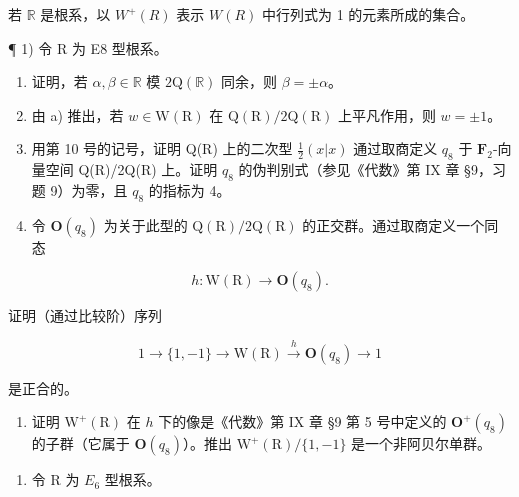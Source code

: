 
若 \(\mathbb{R}\) 是根系，以 \(W^{+}(R)\) 表示 \(W(R)\) 中行列式为 1 的元素所成的集合。

¶ 1) 令 R 为 E8 型根系。

\begin{enumerate}
\def\labelenumi{\alph{enumi})}
\item
  证明，若 \(\alpha, \beta \in \mathbb{R}\) 模 \(2\mathrm{Q}(\mathbb{R})\) 同余，则 \(\beta = \pm \alpha\)。
\item
  由 a) 推出，若 \(w \in \mathrm{W}(\mathrm{R})\) 在 \(\mathrm{Q}(\mathrm{R}) / 2\mathrm{Q}(\mathrm{R})\) 上平凡作用，则 \(w = \pm 1\)。
\item
  用第 10 号的记号，证明 Q(R) 上的二次型 \(\frac{1}{2}(x|x)\) 通过取商定义 \(q_{8}\) 于 \(\mathbf{F}_2\)-向量空间 Q(R)/2Q(R) 上。证明 \(q_{8}\) 的伪判别式（参见《代数》第 IX 章 §9，习题 9）为零，且 \(q_{8}\) 的指标为 4。
\item
  令 \(\mathbf{O}(q_{8})\) 为关于此型的 \(\mathrm{Q}(\mathrm{R})/2\mathrm{Q}(\mathrm{R})\) 的正交群。通过取商定义一个同态
\end{enumerate}

\[
h: \mathrm{W} (\mathrm{R}) \rightarrow \mathbf {O} (q _ {8}).
\]

证明（通过比较阶）序列

\[
1 \rightarrow \{1, - 1 \} \rightarrow \mathrm{W(R)} \stackrel {h} {\longrightarrow} \mathbf {O} (q _ {8}) \rightarrow 1
\]

是正合的。

\begin{enumerate}
\def\labelenumi{\alph{enumi})}
\setcounter{enumi}{4}
\tightlist
\item
  证明 \(\mathrm{W}^{+}(\mathrm{R})\) 在 \(h\) 下的像是《代数》第 IX 章 §9 第 5 号中定义的 \(\mathbf{O}^{+}(q_{8})\) 的子群（它属于 \(\mathbf{O}(q_8)\)）。推出 \(\mathrm{W}^{+}(\mathrm{R}) / \{1, -1\}\) 是一个非阿贝尔单群。
\end{enumerate}

\begin{enumerate}
\def\labelenumi{\arabic{enumi})}
\setcounter{enumi}{1}
\tightlist
\item
  令 R 为 \(E_{6}\) 型根系。
\end{enumerate}

